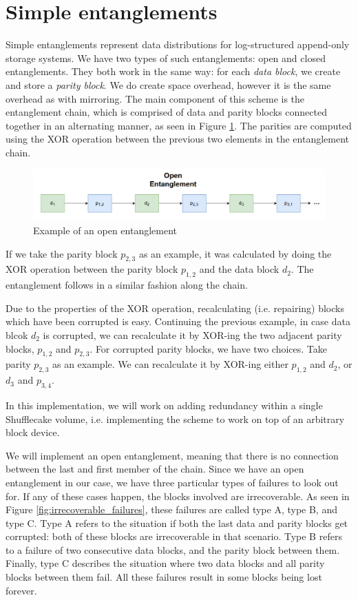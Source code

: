 \documentclass[a4paper,11pt,oneside]{report}
\begin{document}
\section{Simple entanglements}
Simple entanglements represent data distributions for log-structured append-only storage systems. We have two types of such entanglements: open and closed entanglements. They both work in the same way: for each \emph{data block}, we create and store a \emph{parity block}. We do create space overhead, however it is the same overhead as with mirroring. The main component of this scheme is the entanglement chain, which is comprised of data and parity blocks connected together in an alternating manner, as seen in Figure \ref{entanglement}. The parities are computed using the XOR operation between the previous two elements in the entanglement chain. 

\begin{figure}[!ht]
    \centering
    \includegraphics[scale=0.5]{figures/Open_entanglement.PNG}
    \caption{Example of an open entanglement}
    \label{entanglement}
\end{figure}

If we take the parity block $p_{2,3}$ as an example, it was calculated by doing the XOR operation between the parity block $p_{1,2}$ and the data block $d_{2}$. The entanglement follows in a similar fashion along the chain. 

Due to the properties of the XOR operation, recalculating (i.e. repairing) blocks which have been corrupted is easy. Continuing the previous example, in case data blcok $d_{2}$ is corrupted, we can recalculate it by XOR-ing the two adjacent parity blocks, $p_{1,2}$ and $p_{2,3}$. For corrupted parity blocks, we have two choices. Take parity $p_{2,3}$ as an example. We can recalculate it by XOR-ing either $p_{1,2}$ and $d_{2}$, or $d_{3}$ and $p_{3,4}$. 

In this implementation, we will work on adding redundancy within a single Shufflecake volume, i.e. implementing the scheme to work on top of an arbitrary block device. 

We will implement an open entanglement, meaning that there is no connection between the last and first member of the chain. Since we have an open entanglement in our case, we have three particular types of failures to look out for. If any of these cases happen, the blocks involved are irrecoverable. As seen in Figure \ref{fig:irrecoverable_failures}, these failures are called type A, type B, and type C. Type A refers to the situation if both the last data and parity blocks get corrupted: both of these blocks are irrecoverable in that scenario. Type B refers to a failure of two consecutive data blocks, and the parity block between them. Finally, type C describes the situation where two data blocks and all parity blocks between them fail. All these failures result in some blocks being lost forever. 
\end{document}
